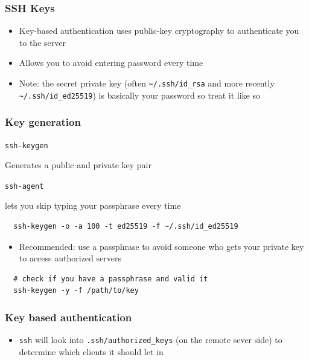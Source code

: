 \documentclass[letterpaper,12pt]{article}
\newcommand*{\lstitem}[1]{
  \setbox0\hbox{\lstinline{#1}}
  \item[\usebox0]
}
\begin{document}
\subsubsection{SSH Keys}

\begin{itemize}
 \item Key-based authentication uses public-key cryptography to authenticate you to the server
 \item Allows you to avoid entering password every time
 \item Note: the secret private key (often \lstinline{~/.ssh/id_rsa} and more recently \lstinline{~/.ssh/id_ed25519}) is basically your password so treat it like so
\end{itemize}

\subsubsection{Key generation}

\begin{description}
 \lstitem{ssh-keygen} Generates a public and private key pair
 \lstitem{ssh-agent} lets you skip typing your passphrase every time
\end{description}

\begin{lstlisting}
  ssh-keygen -o -a 100 -t ed25519 -f ~/.ssh/id_ed25519
\end{lstlisting}

\begin{itemize}
 \item Recommended: use a passphrase to avoid someone who gets your private key to access authorized servers
\end{itemize}

\begin{lstlisting}
  # check if you have a passphrase and valid it
  ssh-keygen -y -f /path/to/key
\end{lstlisting}

\subsubsection{Key based authentication}
\begin{itemize}
 \item \lstinline{ssh} will look into \lstinline{.ssh/authorized_keys} (on the remote sever side) to determine which clients it should let in
\end{itemize}
\end{document}
